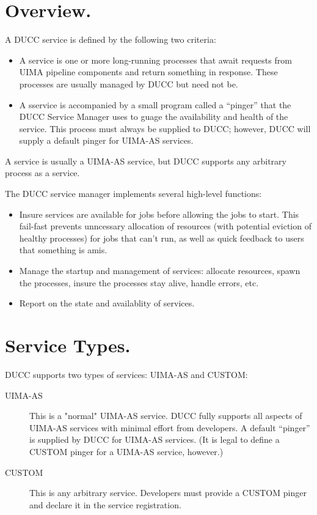 
      \section{Overview.} 
      A DUCC service is defined by the following two criteria:
      \begin{itemize}
          \item A service is one or more long-running processes that await requests from
            UIMA pipeline components and return something in response.  These processes
            are usually managed by DUCC but need not be.
          \item A sservice is accompanied by a small program called a ``pinger'' that
            the DUCC Service Manager uses to guage the availability and health of the
            service.  This process must always be supplied to DUCC; however, DUCC will
            supply a default pinger for UIMA-AS services.
      \end{itemize}

      A service is usually a UIMA-AS service, but DUCC supports any arbitrary process
      as a service.

      The DUCC service manager implements several high-level functions:
      
      \begin{itemize}
          \item Insure services are available for jobs before allowing the jobs to start. This fail-fast
            prevents unncessary allocation of resources (with potential eviction of healthy processes)
            for jobs that can't run, as well as quick feedback to users that something is amis.
      
          \item Manage the startup and management of services: allocate resources, spawn the
            processes, insure the processes stay alive, handle errors, etc.
      
          \item Report on the state and availablity of services.
       \end{itemize}


    \section{Service Types.}
    \label{sec:services.types}
      DUCC supports two types of services: UIMA-AS and CUSTOM:
      
      \begin{description}
          \item[UIMA-AS] This is a "normal" UIMA-AS service. DUCC fully supports all aspects of UIMA-AS
            services with minimal effort from developers.  A default ``pinger'' is supplied by DUCC
            for UIMA-AS services.  (It is legal to define a CUSTOM pinger for a UIMA-AS service,
            however.)
            
          \item[CUSTOM] This is any arbitrary service.  Developers must provide a CUSTOM pinger
            and declare it in the service registration.            
      \end{description}

